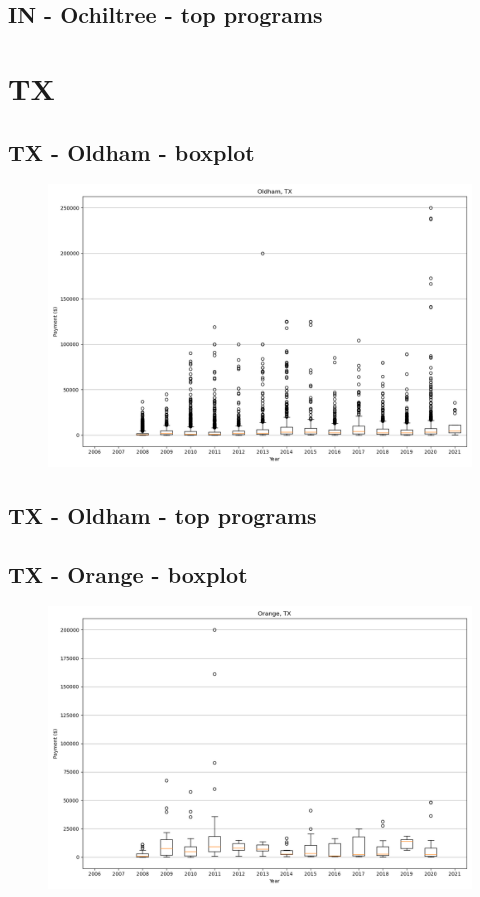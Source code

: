 \subsection*{IN - Ochiltree - top programs}

\newpage
\section*{TX}
\subsection*{TX - Oldham - boxplot}
\begin{figure}[h]
\centering
\includegraphics[width=7in]{../output/boxplots/counties/Oldham-TX_boxplot.png}
\end{figure}


\subsection*{TX - Oldham - top programs}

\newpage
\subsection*{TX - Orange - boxplot}
\begin{figure}[h]
\centering
\includegraphics[width=7in]{../output/boxplots/counties/Orange-TX_boxplot.png}
\end{figure}


